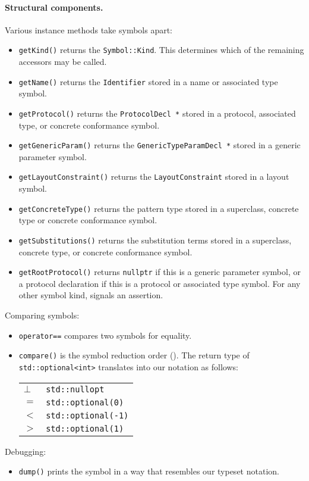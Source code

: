 \documentclass[../generics]{subfiles}
\begin{document}
\paragraph{Structural components.} Various instance methods take symbols apart:
\begin{itemize}
\item \texttt{getKind()} returns the \texttt{Symbol::Kind}. This determines which of the remaining accessors may be called.
\item \texttt{getName()} returns the \texttt{Identifier} stored in a name or associated type symbol.
\item \texttt{getProtocol()} returns the \texttt{ProtocolDecl *} stored in a protocol, associated type, or concrete conformance symbol.
\item \texttt{getGenericParam()} returns the \texttt{GenericTypeParamDecl *} stored in a generic parameter symbol.
\item \texttt{getLayoutConstraint()} returns the \texttt{LayoutConstraint} stored in a layout symbol.
\item \texttt{getConcreteType()} returns the pattern type stored in a superclass, concrete type or concrete conformance symbol.
\item \texttt{getSubstitutions()} returns the substitution terms stored in a superclass, concrete type, or concrete conformance symbol.
\item \texttt{getRootProtocol()} returns \texttt{nullptr} if this is a generic parameter symbol, or a protocol declaration if this is a protocol or associated type symbol. For any other symbol kind, signals an assertion.
\end{itemize}
Comparing symbols:
\begin{itemize}
\item \texttt{operator==} compares two symbols for equality.
\item \texttt{compare()} is the symbol reduction order (). The return type of \texttt{std::optional<int>} translates into our notation as follows:
\begin{center}
\begin{tabular}{ll}
\toprule
$\bot$ & \verb|std::nullopt| \\
$=$ & \verb|std::optional(0)| \\
$<$ & \verb|std::optional(-1)| \\
$>$ & \verb|std::optional(1)| \\
\bottomrule
\end{tabular}
\end{center}
\end{itemize}
Debugging:
\begin{itemize}
\item \texttt{dump()} prints the symbol in a way that resembles our typeset notation.
\end{itemize}
\end{document}
